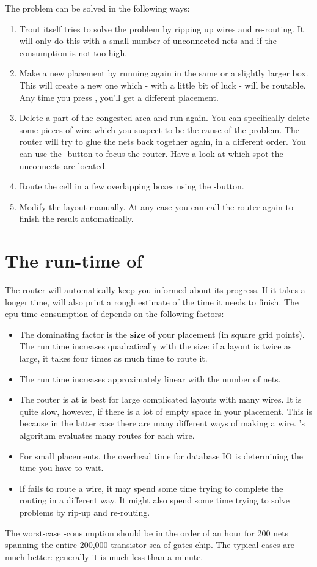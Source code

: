 The problem can be solved in the following ways:
\begin{enumerate}
\item
Trout itself tries to solve the problem by ripping up 
wires and re-routing. It will only do this with a small number
of unconnected nets and if the -consumption is not too high.
\item
Make a new placement by running  again in the
same or a slightly larger box. This will create a new one
which - with a little bit of luck - will be routable. Any time you press
, you'll get a different placement.
\item
Delete a part of the congested area and run 
again.  You can specifically delete some pieces of wire
which you suspect to be the cause of the problem.  The
router will try to glue the nets back together again, in a
different order.  You can use the -button
to focus the router.  Have a look at which spot the
unconnects are located.
\item
Route the cell in a few overlapping boxes using the
-button.
\item
Modify the layout manually. At any case you can call the
router again to finish the result automatically.
\end{enumerate}

\section{The run-time of \protect{}}
The router will automatically keep you informed about its progress. If it
takes a longer time,  will also print a rough estimate of the time
it needs to finish. The cpu-time consumption of  depends on the
following factors:
\begin{itemize}
\item
The dominating factor is the {\bf size} of your placement (in square
grid points).  The run time increases quadratically with the size: if a layout
is twice as large, it takes four times as much time to route it.
\item
The run time increases approximately linear with the number of nets.
\item
The router is at is best for large complicated layouts with many wires. It is
quite slow, however, if there is a lot of empty space in your placement. This
is because in the latter case there are many different ways of making a wire.
's algorithm evaluates many routes for each wire.
\item
For small placements, the overhead time for database IO is 
determining the time you have to wait.
\item
If  fails to route a wire, it may spend some time trying to
complete the routing in a different way. It might also spend some time trying
to solve problems by rip-up and re-routing.
\end{itemize}
The worst-case -consumption should be in the order of an hour for 200 nets
spanning the entire 200,000 transistor sea-of-gates chip. The typical cases are
much better: generally it is much less than a minute.


